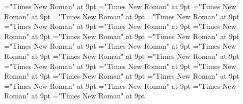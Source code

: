 \documentclass[gps1,twoside]{article}
\begin{document}
\font\semanticdomainssensesensessensesensesentrybefore="Times New Roman" at 9pt
\font\semanticdomainssensesensessensesensesentryafter="Times New Roman" at 9pt
\font\spanspanabbreviationsemanticdomainsemanticdomainssensesensessensesensesentrybefore="Times New Roman" at 9pt
\font\spanabbreviationsemanticdomainsemanticdomainssensesensessensesensesentrylastchildafter="Times New Roman" at 9pt
\font\spanspannamesemanticdomainsemanticdomainssensesensessensesensesentrybefore="Times New Roman" at 9pt
\font\academicdomainacademicdomainacademicdomainssensesensessensesensesentrybefore="Times New Roman" at 9pt
\font\academicdomainssensesensessensesensesentrybefore="Times New Roman" at 9pt
\font\academicdomainssensesensessensesensesentryafter="Times New Roman" at 9pt
\font\spanspanabbreviationacademicdomainacademicdomainssensesensessensesensesentrybefore="Times New Roman" at 9pt
\font\spanspannameacademicdomainacademicdomainssensesensessensesensesentrybefore="Times New Roman" at 9pt
\font\spannameacademicdomainacademicdomainssensesensessensesensesentryfirstchildbefore="Times New Roman" at 9pt
\font\spannameacademicdomainacademicdomainssensesensessensesensesentrylastchildafter="Times New Roman" at 9pt
\font\usageusageusagessensesensessensesensesentrybefore="Times New Roman" at 9pt
\font\usagessensesensessensesensesentrybefore="Times New Roman" at 9pt
\font\usagessensesensessensesensesentryafter="Times New Roman" at 9pt
\font\spanspanabbreviationusageusagessensesensessensesensesentrybefore="Times New Roman" at 9pt
\font\complexformsnotsubentrycomplexformsnotsubentrycomplexformsnotsubentriessensesensessensesensesentrybefore="Times New Roman" at 9pt
\font\complexformsnotsubentriessensesensessensesensesentryafter="Times New Roman" at 9pt
\font\complexformtypescomplexformsnotsubentrycomplexformsnotsubentriessensesensessensesensesentryafter="Times New Roman" at 9pt
\font\spanspanreverseabbrcomplexformtypecomplexformtypescomplexformsnotsubentrycomplexformsnotsubentriessensesensessensesensesentrybefore="Times New Roman" at 9pt
\font\spanspanheadwordcomplexformsnotsubentrycomplexformsnotsubentriessensesensessensesensesentrybefore="Times New Roman" at 9pt
\font\spanspanowningentrysummarydefinitioncomplexformsnotsubentrycomplexformsnotsubentriessensesensessensesensesentrybefore="Times New Roman" at 9pt
\font\spanowningentrysummarydefinitioncomplexformsnotsubentrycomplexformsnotsubentriessensesensessensesensesentryfirstchildbefore="Times New Roman" at 9pt
\font\spanowningentrysummarydefinitioncomplexformsnotsubentrycomplexformsnotsubentriessensesensessensesensesentrylastchildafter="Times New Roman" at 9pt
\end{document}

